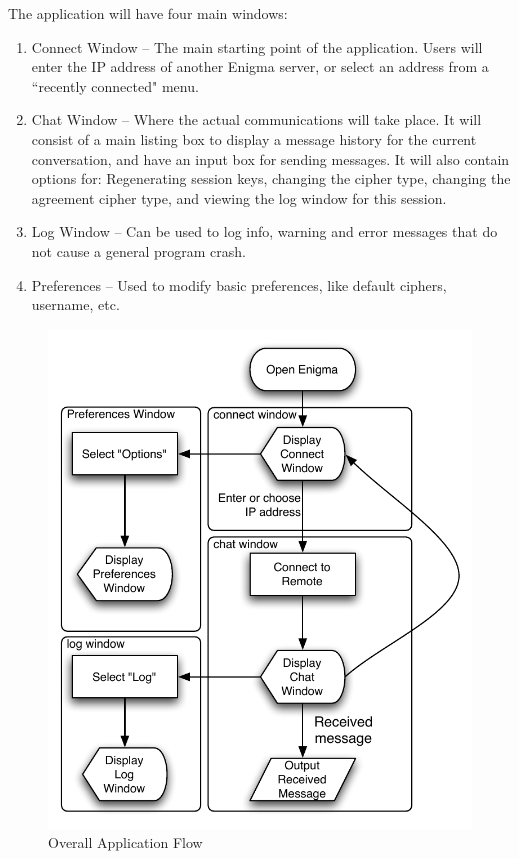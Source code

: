     The application will have four main windows:
    
    \begin{enumerate}
      \item Connect Window -- The main starting point of the application. Users will enter the IP address of another Enigma server, or select an address from a ``recently connected" menu.
      \item Chat Window -- Where the actual communications will take place. It will consist of a main listing box to display a message history for the current conversation, and have an input box for sending messages. It will also contain options for: Regenerating session keys, changing the cipher type, changing the agreement cipher type, and viewing the log window for this session.
      \item Log Window -- Can be used to log info, warning and error messages that do not cause a general program crash.
      \item Preferences -- Used to modify basic preferences, like default ciphers, username, etc.
    \end{enumerate}
    
     \begin{figure}
       \centering
       \includegraphics[scale=0.7]{./Figures/Ch6/6-3-1-2a.pdf}
       \caption{Overall Application Flow}
       \label{fig:app_flow}
     \end{figure}
    
